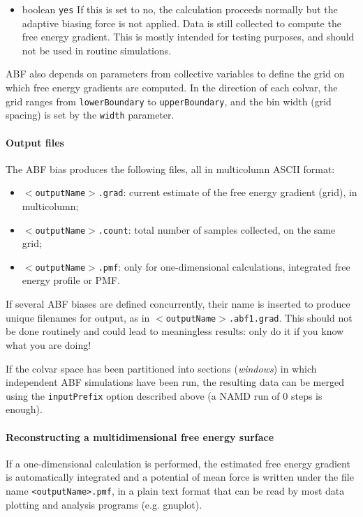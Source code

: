 \begin{itemize}
\item {}
  {boolean}
  {\texttt{yes}}
  { If this is set to no, the calculation proceeds normally but the adaptive
    biasing force is not applied. Data is still collected to compute
    the free energy gradient. This is mostly intended for testing purposes, and should
    not be used in routine simulations.
  }
\end{itemize}

ABF also depends on parameters from collective variables to define the grid on which free
energy gradients are computed. In the direction of each colvar, the grid ranges from
\texttt{lowerBoundary} to \texttt{upperBoundary}, and the bin width (grid spacing)
is set by the \texttt{width} parameter.


\paragraph*{Output files}

The ABF bias produces the following files, all in multicolumn ASCII format:
\begin{itemize}
\item \texttt{$<$outputName$>$.grad}: current estimate of the free energy gradient (grid),
  in multicolumn;
\item \texttt{$<$outputName$>$.count}: total number of samples collected, on the same grid;
\item \texttt{$<$outputName$>$.pmf}: only for one-dimensional calculations, integrated
  free energy profile or PMF.
\end{itemize}

If several ABF biases are defined concurrently, their name is inserted to produce
unique filenames for output, as in \texttt{$<$outputName$>$.abf1.grad}.
This should not be done routinely and could lead to meaningless results:
only do it if you know what you are doing!

If the colvar space has been partitioned into sections (\emph{windows}) in which independent
ABF simulations have been run, the resulting data can be merged using the
\texttt{inputPrefix} option described above (a NAMD run of 0 steps is enough).

\paragraph*{Reconstructing a multidimensional free energy surface}

If a one-dimensional calculation is performed, the estimated free energy
gradient is automatically integrated and a potential of mean force is written
under the file name \texttt{<outputName>.pmf}, in a plain text format that
can be read by most data plotting and analysis programs (e.g. gnuplot).

